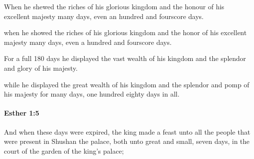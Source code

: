 			When he shewed the riches of his glorious kingdom and the honour of his excellent majesty many days, even an hundred and fourscore days.

			\begin{versebox}
					\item[BHS] 
					\item[LXX] 
					\item[ASV] when he showed the riches of his glorious kingdom and the honor of his excellent majesty many days, even a hundred and fourscore days.
					\item[NIV] For a full 180 days he displayed the vast wealth of his kingdom and the splendor and glory of his majesty.
					\item[NRSV] while he displayed the great wealth of his kingdom and the splendor and pomp of his majesty for many days, one hundred eighty days in all.
			\end{versebox}

		\paragraph{Esther 1:5} %
			\label{ESTHER-1-5}

			And when these days were expired, the king made a feast unto all the people that were present in Shushan the palace, both unto great and small, seven days, in the court of the garden of the king’s palace;

